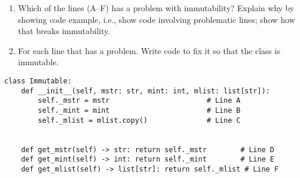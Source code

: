 \documentclass[oneside,11pt,dvipsnames]{book}
\newcommand{\sol}[1]{\iftoggle{usesol}{\textbf{Sol:} #1}{}}
\newcommand{\code}[1]{\texttt{#1}}
\begin{document}
\begin{enumerate}
\item Which of the lines (A--F) has a problem with immutability? Explain why by showing code example, i.e., show code involving problematic lines; show how that breaks immutability.

\sol{Only line F is problematic. It returns a reference to the internal list, which can be modified. Note that line C has no issue because it creates a copy of the list. If there was no copy, then this would cause a problem as \code{mlist} could be modified outside the class and affects \code{\_mlist}.}
\item For each line that has a problem.  Write code to fix it so that the class is immutable.

\sol{To fix line F, simply return copy, i.e., return self.\_mlist.copy().}
\end{enumerate}

    
\begin{lstlisting}
class Immutable:
    def __init__(self, mstr: str, mint: int, mlist: list[str]):
        self._mstr = mstr                       # Line A
        self._mint = mint                       # Line B
        self._mlist = mlist.copy()              # Line C

    
    def get_mstr(self) -> str: return self._mstr        # Line D
    def get_mint(self) -> int: return self._mint        # Line E
    def get_mlist(self) -> list[str]: return self._mlist # Line F
\end{lstlisting}








\end{document}
